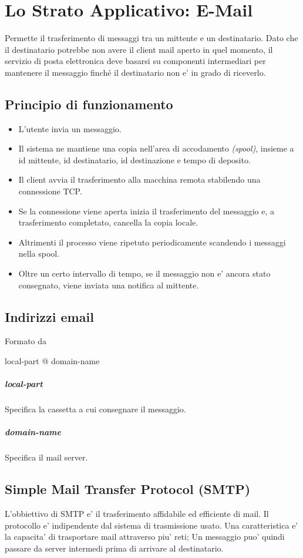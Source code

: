 \chapter{Lo Strato Applicativo: E-Mail}
Permette il trasferimento di messaggi tra un mittente e un destinatario.
Dato che il destinatario potrebbe non avere il client mail aperto in quel momento, il servizio di posta elettronica deve basarsi su componenti intermediari per mantenere il messaggio finché il destinatario non e' in grado di riceverlo.
\section{Principio di funzionamento}
\begin{itemize}
    \item L'utente invia un messaggio.
    \item Il sistema ne mantiene una copia nell'area di accodamento \textit{(spool)}, insieme a id mittente, id destinatario, id destinazione e tempo di deposito.
    \item Il client avvia il trasferimento alla macchina remota  stabilendo una connessione TCP.
    \item Se la connessione viene aperta inizia il trasferimento del messaggio e, a trasferimento completato, cancella la copia locale.
    \item Altrimenti il processo viene ripetuto periodicamente scandendo i messaggi nella spool.
    \item Oltre un certo intervallo di tempo, se il messaggio non e' ancora stato consegnato, viene inviata una notifica al mittente.
\end{itemize}
\section{Indirizzi email}
Formato da
\begin{center}
    local-part @ domain-name
\end{center}
\paragraph{local-part} Specifica la cassetta a cui consegnare il messaggio.
\paragraph{domain-name} Specifica il mail server.

\section{Simple Mail Transfer Protocol (SMTP)}
L'obbiettivo di SMTP e' il trasferimento affidabile ed efficiente di mail.
Il protocollo e' indipendente dal sistema di trasmissione usato.
Una caratteristica e' la capacita' di trasportare mail attraverso piu' reti; Un messaggio puo' quindi passare da server intermedi prima di arrivare al destinatario.

